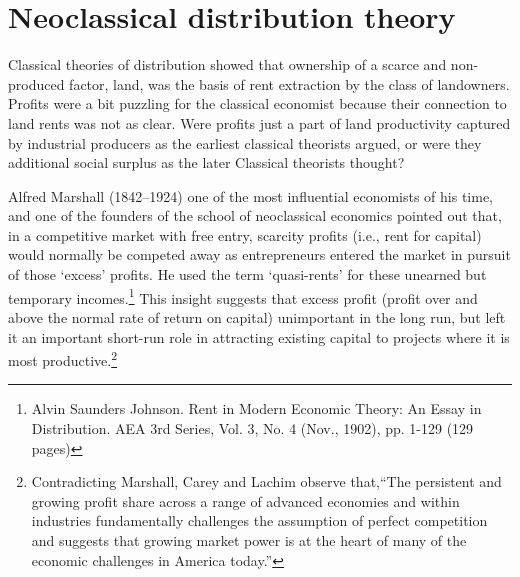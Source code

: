 
\section{Neoclassical distribution theory}

Classical theories of distribution showed that ownership of a scarce and non-produced factor, land, was the  basis of rent extraction by the class of landowners. Profits were a bit puzzling for the classical economist because their connection to land rents was not as clear. Were profits just a part of land productivity captured by industrial producers as the earliest classical theorists argued, or were they  additional social surplus as the later Classical theorists thought? %

Alfred Marshall (1842--1924)  one of the most influential economists of his time, and one of the founders of the school of neoclassical economics pointed out that, in a competitive market with free entry, scarcity profits (i.e., rent for capital) would normally be competed away  as entrepreneurs entered the market in pursuit of those `excess' profits. He used the term `quasi-rents' for these unearned but temporary incomes.\footnote{Alvin Saunders Johnson. Rent in Modern Economic Theory: An Essay in Distribution. AEA 3rd Series, Vol. 3, No. 4 (Nov., 1902), pp. 1-129 (129 pages)} This insight suggests that excess profit (profit over and above the normal rate of return on capital) unimportant in the long run, but left it an important short-run role in attracting existing capital to projects where it is most productive.\footnote{Contradicting Marshall, Carey and Lachim \cite{careySomethingNothingHow2019} observe that,``The persistent and growing profit share across a range of advanced economies and within industries fundamentally challenges the assumption of perfect competition and suggests that growing market power is at the heart of many of the economic challenges in America today.'' } 

